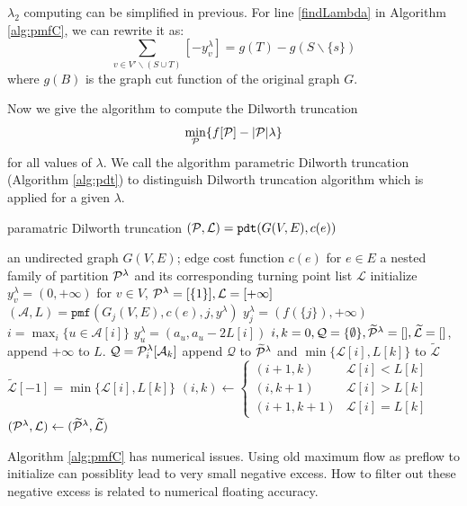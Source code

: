 \documentclass{article}
\begin{document}
$\lambda_2$ computing can be simplified in previous. For line \ref{findLambda} in  Algorithm \ref{alg:pmfC},  we can rewrite it as:
\begin{equation*}
\sum_{v\in V'\backslash (S\cup T)} [-y^{\lambda}_v ] = g(T)-g(S\backslash\{s\})
\end{equation*}
where $g(B)$ is the graph cut function of the original graph $G$.

Now we give the algorithm to compute the Dilworth truncation $$\min_{\P}\{f[\P] - \abs{\P} \lambda \}$$for all values of $\lambda$. We call the algorithm parametric Dilworth truncation (Algorithm \ref{alg:pdt}) to distinguish Dilworth truncation algorithm which is applied for a given $\lambda$.
\begin{algorithm}
\caption{paramatric Dilworth truncation $(\P, \mathcal{L})=\texttt{pdt}(G(V,E), c(e))$}\label{alg:pdt}
\begin{algorithmic}[1]
\REQUIRE an undirected graph $G(V, E)$; edge cost function $c(e)$ for $e\in E$
\ENSURE a nested family of partition $\P^{\lambda}$ and its corresponding turning point list $\mathcal{L}$
\STATE initialize $y^{\lambda}_v = (0, +\infty)$ for $ v \in V$, $\P^{\lambda} = [\{1\}], \mathcal{L} = [+\infty]$
\STATE  $(\mathcal{A}, L) = \texttt{pmf}(G_j(V,E), c(e), j, y^{\lambda})$\footnotemark
{}
\STATE $y^{\lambda}_j = (f(\{j\}), +\infty)$
\ELSE
\STATE $ i = \max_i \{ u \in \mathcal{A}[i]\}$
\STATE $y_u^{\lambda} = (a_u, a_u - 2 L[i])$
\ENDIF
\ENDIF
\ENDFOR
\STATE $i, k = 0, \mathcal{Q} = \{\emptyset\}, \widetilde{\mathcal{\P}}^{\lambda} = [], \widetilde{\mathcal{L}} = []$, append $+\infty$ to $L$.
\STATE $\mathcal{Q} = \P^{\lambda}_i[\mathcal{A}_k]$
\STATE append $\mathcal{Q}$ to $\widetilde{\mathcal{\P}}^{\lambda}$ and $\min\{\mathcal{L}[i], L[k]\}$
to $\widetilde{\mathcal{L}}$
\ELSE
\STATE $\widetilde{\mathcal{L}}[-1] = \min\{\mathcal{L}[i], L[k]\}$
\ENDIF
\STATE $(i, k) \leftarrow \begin{cases} (i+1, k) & \mathcal{L}[i] < L[k] \\  (i, k+1) & \mathcal{L}[i] > L[k]\\ (i+1, k+1) & \mathcal{L}[i] = L[k]\end{cases}$
\ENDWHILE
\STATE $(\P^{\lambda}, \mathcal{L}) \leftarrow (\widetilde{\mathcal{\P}}^{\lambda},  \widetilde{\mathcal{L}})$
\ENDFOR
\end{algorithmic}
\end{algorithm}
Algorithm \ref{alg:pmfC} has numerical issues. Using old maximum flow as preflow to initialize can possiblity lead to very small negative excess. How to filter out these negative excess is related to numerical floating accuracy.
\end{document}
